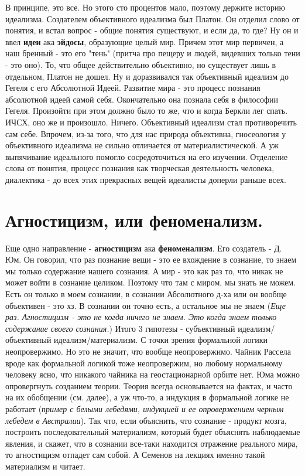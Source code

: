 В принципе, это все. Но этого сто процентов мало, поэтому держите историю идеализма. Создателем объективного идеализма был Платон. Он отделил слово от понятия, и встал вопрос - общие понятия существуют, и если да, то где? Ну он и ввел \textbf{идеи} ака \textbf{эйдосы}, образующие целый мир. Причем этот мир первичен, а наш бренный - это его "тень" (притча про пещеру и людей, видевших только тени - это оно). То, что общее действительно объективно, но существует лишь в отдельном, Платон не дошел. Ну и доразвивался так объективный идеализм до Гегеля с его Абсолютной Идеей. Развитие мира - это процесс познания абсолютной идеей самой себя. Окончательно она познала себя в философии Гегеля. Произойти при этом должно было то же, что и когда Беркли лег спать. ИЧСХ, оно же и произошло. Ничего. Объективный идеализм стал противоречить сам себе. Впрочем, из-за того, что для нас природа объективна, гносеология у объективного идеализма не сильно отличается от материалистической. А уж выпячивание идеального помогло сосредоточиться на его изучении. Отделение слова от понятия, процесс познания как творческая деятельность человека, диалектика - до всех этих прекрасных вещей идеалисты доперли раньше всех.

\section{ Агностицизм, или феноменализм.}
Еще одно направление - \textbf{агностицизм} ака \textbf{феноменализм}. Его создатель - Д. Юм. Он говорил, что раз познание вещи - это ее вхождение в сознание, то знаем мы только содержание нашего сознания. А мир - это как раз то, что никак не может войти в сознание целиком. Поэтому что там с миром, мы знать не можем. Есть он только в моем сознании, в сознании Абсолютного д-ха или он вообще объективен - это хз. В сознании он точно есть, а остальное мы не знаем (\textit{Еще раз. Агностицизм - это не когда ничего не знаем. Это когда знаем только содержание своего сознания.}) Итого 3 гипотезы - субъективный идеализм/объективный идеализм/материализм. С точки зрения формальной логики неопровержимо. Но это не значит, что вообще неопровержимо. Чайник Рассела вроде как формальной логикой тоже неопровержим, но любому нормальному человеку ясно, что никакого чайника на геостационарной орбите нет. Юма можно опровергнуть созданием теории. Теория всегда основывается на фактах, и часто на их обобщении (см. далее), а уж что-то, а индукция в формальной логике не работает (\textit{пример с белыми лебедями, индукцией и ее опровержением черным лебедем в Австралии}). Так что, если объяснить, что сознание - продукт мозга, построить последовательный материализм, который будет объяснять наблюдаемые явления, и скажет, что в сознании все-таки находится отражение реального мира, то агностицизм отпадет сам собой. А Семенов на лекциях именно такой материализм и читает. 

